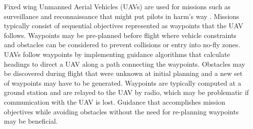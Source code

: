 \documentclass[numbered,pdftex]{ohio-etd}
\begin{document}
Fixed wing Unmanned Aerial Vehicles (UAVs) are used for missions such as surveillance and reconnaissance that might put pilots in harm’s way \cite{bone_uavs_2003}. Missions typically consist of sequential objectives represented as waypoints that the UAV follows. Waypoints may be pre-planned before flight where vehicle constraints and obstacles can be considered to prevent collisions or entry into no-fly zones. UAVs follow waypoints by implementing guidance algorithms that calculate headings to direct a UAV along a path connecting the waypoints. Obstacles may be discovered during flight that were unknown at initial planning and a new set of waypoints may have to be generated.  Waypoints are typically computed at a ground station and are relayed to the UAV by radio, which may be problematic if communication with the UAV is lost. Guidance that accomplishes mission objectives while avoiding obstacles without the need for re-planning waypoints may be beneficial. 
\end{document}
